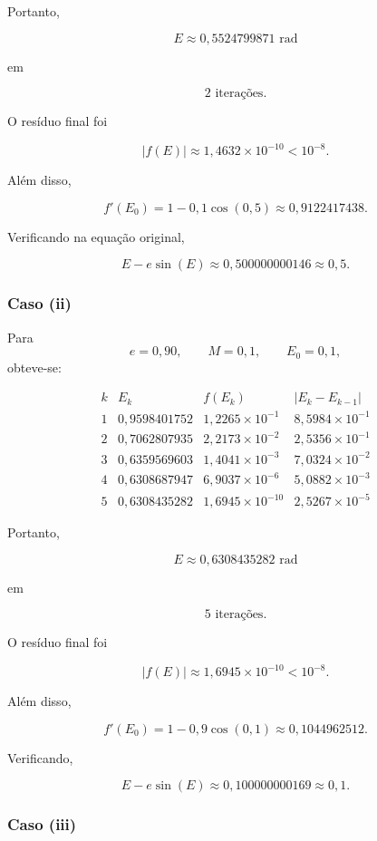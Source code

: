 \documentclass[
	12pt,				%
	openright,			%
	a4paper,			%
	english,			%
	french,				%
	spanish,			%
	brazil,				%
	]{abntex2}
\begin{document}
Portanto,

\[
\boxed{E\approx0,5524799871\text{ rad}}
\]

em

\[
\boxed{2\text{ iterações}}.
\]

O resíduo final foi

\[
|f(E)|
\approx
1,4632\times10^{-10}
<
10^{-8}.
\]

Além disso,

\[
f'(E_0)
=
1-0,1\cos(0,5)
\approx
0,9122417438.
\]

Verificando na equação original,

\[
E-e\sin(E)
\approx
0,500000000146
\approx
0,5.
\]


\subsubsection*{Caso (ii)}

Para
\[
e=0,90,
\qquad
M=0,1,
\qquad
E_0=0,1,
\]
obteve-se:

\[
\begin{array}{c|c|c|c}
k & E_k & f(E_k) & |E_k-E_{k-1}| \\ \hline
1 & 0,9598401752 & 1,2265\times10^{-1} & 8,5984\times10^{-1} \\
2 & 0,7062807935 & 2,2173\times10^{-2} & 2,5356\times10^{-1} \\
3 & 0,6359569603 & 1,4041\times10^{-3} & 7,0324\times10^{-2} \\
4 & 0,6308687947 & 6,9037\times10^{-6} & 5,0882\times10^{-3} \\
5 & 0,6308435282 & 1,6945\times10^{-10} & 2,5267\times10^{-5}
\end{array}
\]

Portanto,

\[
\boxed{E\approx0,6308435282\text{ rad}}
\]

em

\[
\boxed{5\text{ iterações}}.
\]

O resíduo final foi

\[
|f(E)|
\approx
1,6945\times10^{-10}
<
10^{-8}.
\]

Além disso,

\[
f'(E_0)
=
1-0,9\cos(0,1)
\approx
0,1044962512.
\]

Verificando,

\[
E-e\sin(E)
\approx
0,100000000169
\approx
0,1.
\]


\subsubsection*{Caso (iii)}
\end{document}
